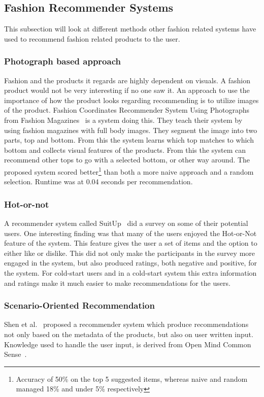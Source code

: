 \subsection{Fashion Recommender Systems}

This subsection will look at different methods other fashion related
systems have used to recommend fashion related products to the user.

\subsubsection{Photograph based approach}
    Fashion and the products it regards are highly dependent on visuals.  A fashion
    product would not be very interesting if no one saw it.  An approach to use the
    importance of how the product looks regarding recommending is to utilize images
    of the product.  Fashion Coordinates Recommender System Using Photographs from
    Fashion Magazines~\cite{Iwata:2011} is a system doing this.  They teach their
    system by using fashion magazines with full body images.  They segment the
    image into two parts, top and bottom.  From this the system learns which top
    matches to which bottom and collects visual features of the products.  From
    this the system can recommend other tops to go with a selected bottom, or other
    way around.  The proposed system scored better\footnote{Accuracy of 50\% on the
    top 5 suggested items, whereas naive and random managed 18\% and under 5\%
    respectively} than both a more naive approach and a random selection.  Runtime
    was at 0.04 seconds per recommendation.

\subsubsection{Hot-or-not}
    A recommender system called SuitUp~\cite{SuitUp} did a survey on some of their potential users.
    One interesting finding was that many of the users enjoyed the Hot-or-Not feature of the system.
    This feature gives the user a set of items and the option to either like or dislike.
    This did not only make the participants in the survey more engaged in the system, but also produced ratings, both negative and positive, for the system.
    For cold-start users and in a cold-start system this extra information and ratings make it much easier to make recommendations for the users.

\subsubsection{Scenario-Oriented Recommendation}
    Shen et al.~\cite{Shen:2007:AIG:1216295.1216368} proposed a recommender system which produce recommendations not only based on the metadata of the products, but also on user written input.
    Knowledge used to handle the user input, is derived from Open Mind Common Sense~\cite{Singh02openmind}.

